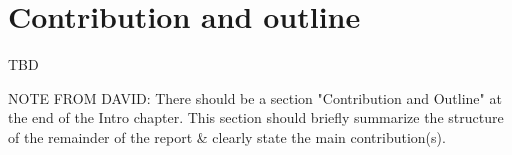 \section{Contribution and outline}

TBD

NOTE FROM DAVID: There should be a section "Contribution and Outline" at the end
of the Intro chapter. This section should briefly summarize the structure of the
remainder of the report \& clearly state the main contribution(s).
